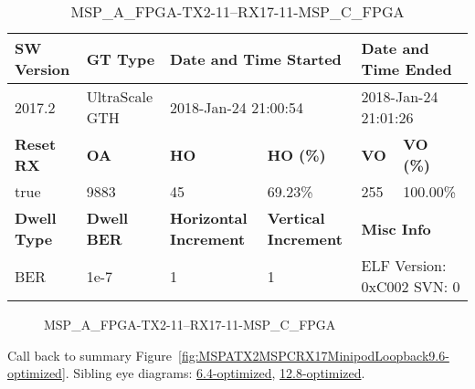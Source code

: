 \begin{table}[h]
\centering
\caption{MSP\_A\_FPGA-TX2-11--RX17-11-MSP\_C\_FPGA}
\label{tab:MSPAFPGATX211RX1711MSPCFPGA9.6-optimized}
\begin{tabular}{@{}|l|l|l|l|l|l|@{}}
\toprule
\textbf{SW Version}                & \textbf{GT Type}   & \multicolumn{2}{l|}{\textbf{Date and Time Started}}            & \multicolumn{2}{l|}{\textbf{Date and Time Ended}}        \\ \midrule
2017.2                       & UltraScale GTH          & \multicolumn{2}{l|}{2018-Jan-24 21:00:54}                   & \multicolumn{2}{l|}{2018-Jan-24 21:01:26}               \\ \midrule
\textbf{Reset RX}                  & \textbf{OA} & \textbf{HO}   & \textbf{HO (\%)} & \textbf{VO} & \textbf{VO (\%)} \\ \midrule
true & 9883        & 45          & 69.23\%        & 255        & 100.00\%       \\ \midrule
\textbf{Dwell Type}                & \textbf{Dwell BER} & \textbf{Horizontal Increment} & \textbf{Vertical Increment}    & \multicolumn{2}{l|}{\textbf{Misc Info}}                  \\ \midrule
BER                            & 1e-7        & 1        & 1           & \multicolumn{2}{l|}{ELF Version: 0xC002 SVN: 0}                         \\ \bottomrule
\end{tabular}
\end{table}

\begin{figure}[h]
\caption{MSP\_A\_FPGA-TX2-11--RX17-11-MSP\_C\_FPGA} \label{fig:MSPAFPGATX211RX1711MSPCFPGA9.6-optimized}
\end{figure}

Call back to summary Figure~\ref{fig:MSPATX2MSPCRX17MinipodLoopback9.6-optimized}.
Sibling eye diagrams: \hyperref[sec:MSPAFPGATX211RX1711MSPCFPGA6.4-optimized]{6.4-optimized}, \hyperref[sec:MSPAFPGATX211RX1711MSPCFPGA12.8-optimized]{12.8-optimized}.

\clearpage
\newpage

